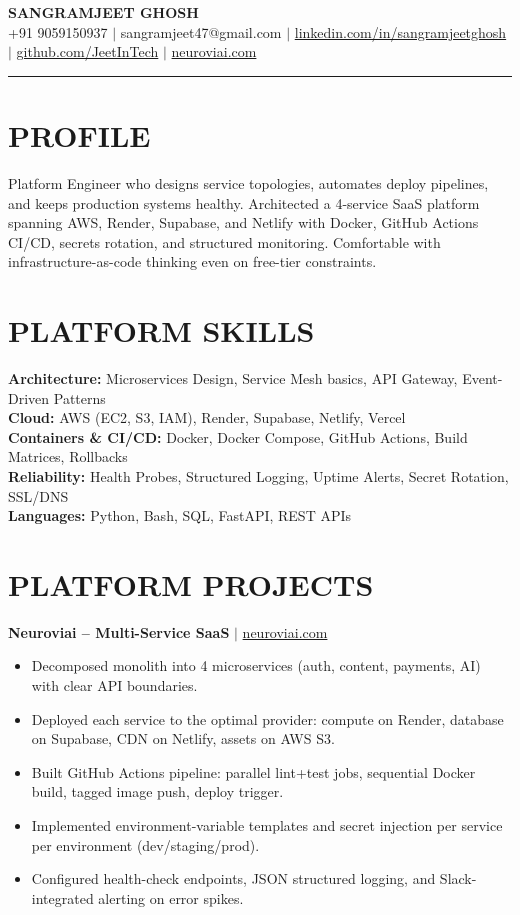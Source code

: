 \documentclass[10pt]{article}
\begin{document}
\begin{center}
{\Large \textbf{SANGRAMJEET GHOSH}} \\[2pt]
{\small +91 9059150937 $|$ sangramjeet47@gmail.com $|$
\href{https://www.linkedin.com/in/sangramjeetghosh}{linkedin.com/in/sangramjeetghosh} $|$
\href{https://github.com/JeetInTech}{github.com/JeetInTech} $|$
\href{https://neuroviai.com}{neuroviai.com}}
\end{center}

\noindent\rule{\textwidth}{0.4pt}

\section*{PROFILE}
Platform Engineer who designs service topologies, automates deploy pipelines, and keeps production systems healthy. Architected a 4-service SaaS platform spanning AWS, Render, Supabase, and Netlify with Docker, GitHub Actions CI/CD, secrets rotation, and structured monitoring. Comfortable with infrastructure-as-code thinking even on free-tier constraints.

\section*{PLATFORM SKILLS}
\textbf{Architecture:} Microservices Design, Service Mesh basics, API Gateway, Event-Driven Patterns \\
\textbf{Cloud:} AWS (EC2, S3, IAM), Render, Supabase, Netlify, Vercel \\
\textbf{Containers \& CI/CD:} Docker, Docker Compose, GitHub Actions, Build Matrices, Rollbacks \\
\textbf{Reliability:} Health Probes, Structured Logging, Uptime Alerts, Secret Rotation, SSL/DNS \\
\textbf{Languages:} Python, Bash, SQL, FastAPI, REST APIs

\section*{PLATFORM PROJECTS}
\textbf{Neuroviai -- Multi-Service SaaS} $|$ \href{https://neuroviai.com}{neuroviai.com}
\begin{itemize}
\item Decomposed monolith into 4 microservices (auth, content, payments, AI) with clear API boundaries.
\item Deployed each service to the optimal provider: compute on Render, database on Supabase, CDN on Netlify, assets on AWS S3.
\item Built GitHub Actions pipeline: parallel lint+test jobs, sequential Docker build, tagged image push, deploy trigger.
\item Implemented environment-variable templates and secret injection per service per environment (dev/staging/prod).
\item Configured health-check endpoints, JSON structured logging, and Slack-integrated alerting on error spikes.
\end{itemize}
\end{document}
